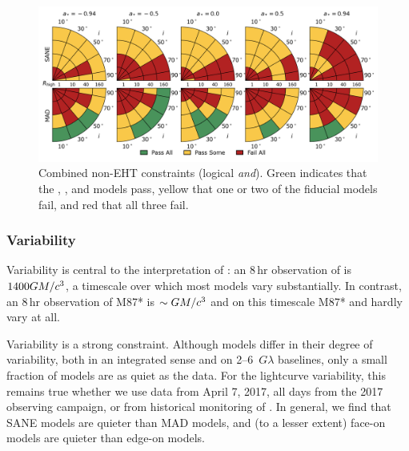 \begin{figure}\label{fig:non_eht_cuts}
  \centering
  \includegraphics[width=\textwidth]{./figures/Non_Interferometric_Constraints.png}
  \caption{Combined non-EHT constraints (logical {\em and}).  Green indicates that the \kharma, \bhac, and \hamr models pass, yellow that one or two of the fiducial models fail, and red that all three fail.}
\end{figure}

\subsubsection{Variability}

Variability is central to  the interpretation of \sgra: an $8\,\mathrm{hr}$ observation of \sgra is $1400 GM/c^3$, a timescale over which most models vary substantially.  In contrast, an $8\,\mathrm{hr}$ observation of M87* is $\sim GM/c^3$ and on this timescale M87* and \sgra hardly vary at all.

Variability is a strong constraint.  Although models differ in their degree of variability, both in an integrated sense and on 2--6~$G\lambda$ baselines, only a small fraction of models are as quiet as the data.  For the lightcurve variability, this remains true whether we use data from April 7, 2017, all days from the 2017 observing campaign, or from historical monitoring of \sgra.   In general, we find that SANE models are quieter than MAD models, and (to a lesser extent) face-on models are quieter than edge-on models.

